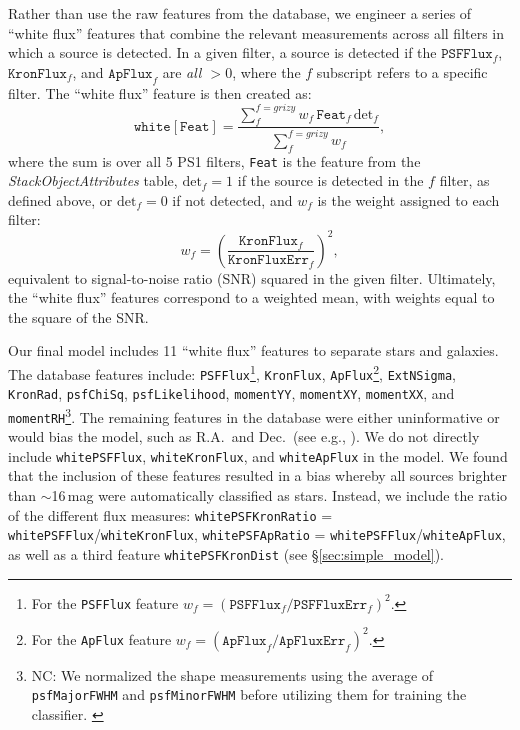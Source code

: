 \documentclass[twocolumn]{aastex62}
\newcommand{\NC}[1]{{\color{gray} NC: {#1}}}
\begin{document}
Rather than use the raw features from the database, we engineer a series of ``white flux'' features that combine the relevant measurements across all filters in which a source is detected. In a given filter, a source is detected if the $\mathtt{PSFFlux}_f$, $\mathtt{KronFlux}_f$, and $\mathtt{ApFlux}_f$ are \textit{all $> 0$}, where the $f$ subscript refers to a specific filter. The ``white flux'' feature is then created as:
%
\begin{equation}
    \mathtt{white[Feat]} =  \frac{\sum_f^{f = grizy} w_f  \, \mathtt{Feat}_f \, \mathrm{det}_f}{\sum_f^{f = grizy} w_f}, 
\end{equation}
%
where the sum is over all 5 PS1 filters, \texttt{Feat} is the feature from the \textit{StackObjectAttributes} table, $\mathrm{det}_f = 1$ if the source is detected in the $f$ filter, as defined above, or $\mathrm{det}_f = 0$ if not detected, and $w_f$ is the weight assigned to each filter:
%
\begin{equation}
    w_f = \left(\frac{\mathtt{KronFlux}_f}{\mathtt{KronFluxErr}_f}\right)^2,
\end{equation}
%
equivalent to signal-to-noise ratio (SNR) squared in the given filter. Ultimately, the ``white flux'' features correspond to a weighted mean, with weights equal to the square of the SNR. 

Our final model includes 11 ``white flux'' features to separate stars and galaxies. The database features include: \texttt{PSFFlux}\footnote{For the \texttt{PSFFlux} feature $w_f = (\mathtt{PSFFlux}_f/\mathtt{PSFFluxErr}_f)^2$.}, \texttt{KronFlux}, \texttt{ApFlux}\footnote{For the \texttt{ApFlux} feature $w_f = (\mathtt{ApFlux}_f/\mathtt{ApFluxErr}_f)^2$.}, \texttt{ExtNSigma}, \texttt{KronRad}, \texttt{psfChiSq}, \texttt{psfLikelihood}, \texttt{momentYY}, \texttt{momentXY}, \texttt{momentXX}, and \texttt{momentRH}\footnote{\NC{We normalized the shape measurements using the average of \texttt{psfMajorFWHM} and  \texttt{psfMinorFWHM} before utilizing them for training the classifier. }}. The remaining features in the database were either uninformative or would bias the model, such as R.A.\ and Dec.\ (see e.g., \citealt{Richards12a,Miller17}). We do not directly include \texttt{whitePSFFlux}, \texttt{whiteKronFlux}, and \texttt{whiteApFlux} in the model. We found that the inclusion of these features resulted in a bias whereby all sources brighter than $\sim$16\,mag were automatically classified as stars. Instead, we include the ratio of the different flux measures: \texttt{whitePSFKronRatio} = \texttt{whitePSFFlux}/\texttt{whiteKronFlux}, \texttt{whitePSFApRatio} = \texttt{whitePSFFlux}/\texttt{whiteApFlux}, as well as a third feature \texttt{whitePSFKronDist} (see \S\ref{sec:simple_model}).
\end{document}
